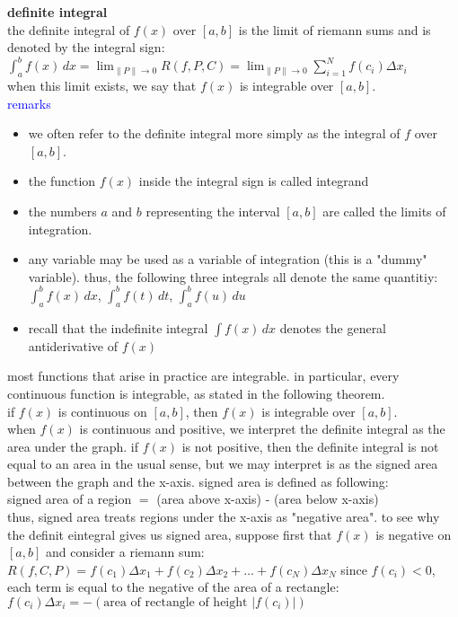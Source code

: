\documentclass{article}
\begin{document}
\textbf{definite integral}\\
the definite integral of $f(x)$ over $[a, b]$ is the limit of riemann sums and is denoted by the integral sign:\\
$\int_{a}^{b}f(x)\, dx = \lim_{\lVert P\rVert \to 0}R(f, P, C) = \lim_{\lVert P\rVert \to 0}\sum_{i=1}^{N}f(c_i)\Delta x_i$\\
when this limit exists, we say that $f(x)$ is integrable over $[a, b]$.\\

\textcolor{blue}{remarks}
	\begin{itemize}
		\item we often refer to the definite integral more simply as the integral of $f$ over $[a, b]$.
		\item the function $f(x)$ inside the integral sign is called integrand
		\item the numbers $a$ and $b$ representing the interval $[a, b]$ are called the limits of integration.
		\item any variable may be used as a variable of integration (this is a "dummy" variable). thus, the following three integrals all denote the same quantitiy: $\int_{a}^{b}f(x)\,dx$, $\int_{a}^{b}f(t)\,dt$, $\int_{a}^{b}f(u)\,du$  
		\item recall that the indefinite integral $\int f(x)\, dx$ denotes the general antiderivative of $f(x)$
	\end{itemize}
most functions that arise in practice are integrable. in particular, every continuous function is integrable, as stated in the following theorem.\\
if $f(x)$ is continuous on $[a, b]$, then $f(x)$ is integrable over $[a, b]$.\\

when $f(x)$ is continuous and positive, we interpret the definite integral as the area under the graph. if $f(x)$ is not positive, then the definite integral is not equal to an area in the usual sense, but we may interpret is as the signed area between the graph and the x-axis. signed area is defined as following:\\
signed area of a region $=$ (area above x-axis) - (area below x-axis)\\

thus, signed area treats regions under the x-axis as "negative area". to see why the definit eintegral gives us signed area, suppose first that $f(x)$ is negative on $[a, b]$ and consider a riemann sum: $R(f, C, P) = f(c_1)\Delta x_1 + f(c_2)\Delta x_2 + \ldots + f(c_N)\Delta x_N$ since $f(c_i) < 0$, each term is equal to the negative of the area of a rectangle: $f(c_i)\Delta x_i = -(\text{area of rectangle of height }\lvert f(c_i)\rvert)$\\
\end{document}
